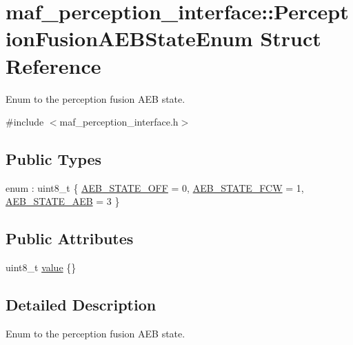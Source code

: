 \hypertarget{structmaf__perception__interface_1_1PerceptionFusionAEBStateEnum}{}\section{maf\+\_\+perception\+\_\+interface\+:\+:Perception\+Fusion\+A\+E\+B\+State\+Enum Struct Reference}
\label{structmaf__perception__interface_1_1PerceptionFusionAEBStateEnum}


Enum to the perception fusion A\+EB state.  




{\ttfamily \#include $<$maf\+\_\+perception\+\_\+interface.\+h$>$}

\subsection*{Public Types}
\begin{DoxyCompactItemize}
\item 
enum \+: uint8\+\_\+t \{ \hyperlink{structmaf__perception__interface_1_1PerceptionFusionAEBStateEnum_a21907690b5850c7463a2a088ea6317bda16fcef67e6ec459f47190610019d7a99}{A\+E\+B\+\_\+\+S\+T\+A\+T\+E\+\_\+\+O\+FF} = 0, 
\hyperlink{structmaf__perception__interface_1_1PerceptionFusionAEBStateEnum_a21907690b5850c7463a2a088ea6317bda3cb92839a352240a1f1756a46c79b1be}{A\+E\+B\+\_\+\+S\+T\+A\+T\+E\+\_\+\+F\+CW} = 1, 
\hyperlink{structmaf__perception__interface_1_1PerceptionFusionAEBStateEnum_a21907690b5850c7463a2a088ea6317bda80d768ba231ca7aefb8e53a5afa19ebe}{A\+E\+B\+\_\+\+S\+T\+A\+T\+E\+\_\+\+A\+EB} = 3
 \}
\end{DoxyCompactItemize}
\subsection*{Public Attributes}
\begin{DoxyCompactItemize}
\item 
uint8\+\_\+t \hyperlink{structmaf__perception__interface_1_1PerceptionFusionAEBStateEnum_a321fb44c14bdf1cb56dde9f9c6d07bc8}{value} \{\}
\end{DoxyCompactItemize}


\subsection{Detailed Description}
Enum to the perception fusion A\+EB state. 

